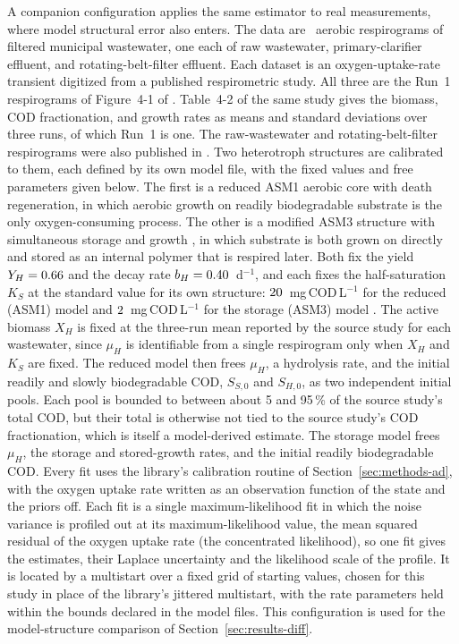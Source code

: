 \documentclass{article}
\begin{document}
A companion configuration applies the same estimator to real measurements, where model structural error also enters. The data are \RespNww\ aerobic respirograms of filtered municipal wastewater, one each of raw wastewater, primary-clarifier effluent, and rotating-belt-filter effluent. Each dataset is an oxygen-uptake-rate transient digitized from a published respirometric study. All three are the Run~1 respirograms of Figure~4-1 of \citet{gupta2018thesis}. Table~4-2 of the same study gives the biomass, COD fractionation, and growth rates as means and standard deviations over three runs, of which Run~1 is one. The raw-wastewater and rotating-belt-filter respirograms were also published in \citet{gupta2018}. Two heterotroph structures are calibrated to them, each defined by its own model file, with the fixed values and free parameters given below. The first is a reduced ASM1 aerobic core with death regeneration, in which aerobic growth on readily biodegradable substrate is the only oxygen-consuming process. The other is a modified ASM3 structure with simultaneous storage and growth \citep{karahangul2003}, in which substrate is both grown on directly and stored as an internal polymer that is respired later. Both fix the yield \(Y_H=0.66\) and the decay rate \(b_H=0.40\)~d\(^{-1}\), and each fixes the half-saturation \(K_S\) at the standard value for its own structure: \(20\)~mg\,COD\,L\(^{-1}\) for the reduced (ASM1) model and \(2\)~mg\,COD\,L\(^{-1}\) for the storage (ASM3) model \citep{henze2000}. The active biomass \(X_H\) is fixed at the three-run mean reported by the source study for each wastewater, since \(\mu_H\) is identifiable from a single respirogram only when \(X_H\) and \(K_S\) are fixed. The reduced model then frees \(\mu_H\), a hydrolysis rate, and the initial readily and slowly biodegradable COD, \(S_{S,0}\) and \(S_{H,0}\), as two independent initial pools. Each pool is bounded to between about 5 and 95\,\% of the source study's total COD, but their total is otherwise not tied to the source study's COD fractionation, which is itself a model-derived estimate. The storage model frees \(\mu_H\), the storage and stored-growth rates, and the initial readily biodegradable COD. Every fit uses the library's calibration routine of Section~\ref{sec:methods-ad}, with the oxygen uptake rate written as an observation function of the state and the priors off. Each fit is a single maximum-likelihood fit in which the noise variance is profiled out at its maximum-likelihood value, the mean squared residual of the oxygen uptake rate (the concentrated likelihood), so one fit gives the estimates, their Laplace uncertainty and the likelihood scale of the profile. It is located by a multistart over a fixed grid of starting values, chosen for this study in place of the library's jittered multistart, with the rate parameters held within the bounds declared in the model files. This configuration is used for the model-structure comparison of Section~\ref{sec:results-diff}.
\end{document}
